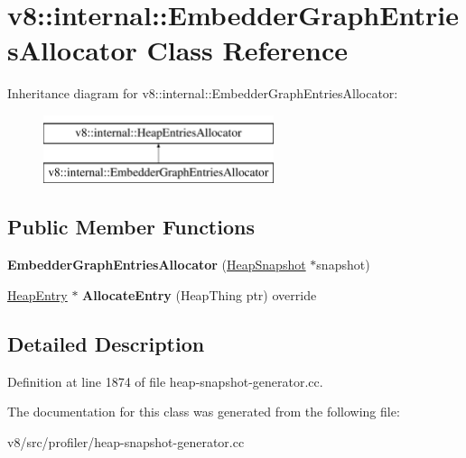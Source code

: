 \hypertarget{classv8_1_1internal_1_1EmbedderGraphEntriesAllocator}{}\section{v8\+:\+:internal\+:\+:Embedder\+Graph\+Entries\+Allocator Class Reference}
\label{classv8_1_1internal_1_1EmbedderGraphEntriesAllocator}
Inheritance diagram for v8\+:\+:internal\+:\+:Embedder\+Graph\+Entries\+Allocator\+:\begin{figure}[H]
\begin{center}
\leavevmode
\includegraphics[height=2.000000cm]{classv8_1_1internal_1_1EmbedderGraphEntriesAllocator}
\end{center}
\end{figure}
\subsection*{Public Member Functions}
\begin{DoxyCompactItemize}
\item 
\mbox{\label{classv8_1_1internal_1_1EmbedderGraphEntriesAllocator_a31f05a1f941fe7084166bdf7e74bafc6}} 
{\bfseries Embedder\+Graph\+Entries\+Allocator} (\mbox{\hyperlink{classv8_1_1internal_1_1HeapSnapshot}{Heap\+Snapshot}} $\ast$snapshot)
\item 
\mbox{\label{classv8_1_1internal_1_1EmbedderGraphEntriesAllocator_a0ef9b059937bfc7c013fc486779d69b8}} 
\mbox{\hyperlink{classv8_1_1internal_1_1HeapEntry}{Heap\+Entry}} $\ast$ {\bfseries Allocate\+Entry} (Heap\+Thing ptr) override
\end{DoxyCompactItemize}


\subsection{Detailed Description}


Definition at line 1874 of file heap-\/snapshot-\/generator.\+cc.



The documentation for this class was generated from the following file\+:\begin{DoxyCompactItemize}
\item 
v8/src/profiler/heap-\/snapshot-\/generator.\+cc\end{DoxyCompactItemize}
